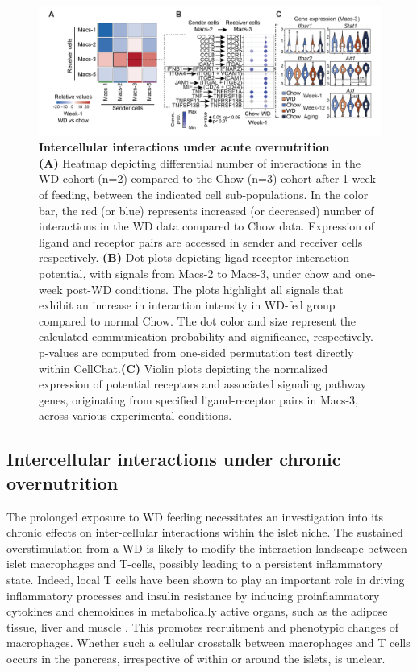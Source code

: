 \begin{figure}[!t]
\centering
\includegraphics[width=\linewidth]{Chapter4/Fig/F2-6-01.png}
\caption[res-cciw1]{\textbf{Intercellular interactions under acute overnutrition}\\
\textbf{(A)} Heatmap depicting differential number of interactions in the WD cohort (n=2) compared to the Chow (n=3) cohort after 1 week of feeding, between the indicated cell sub-populations. In the color bar, the red (or blue) represents increased (or decreased) number of interactions in the WD data compared to Chow data. Expression of ligand and receptor pairs are accessed in sender and receiver cells respectively. \textbf{(B)} Dot plots depicting ligad-receptor interaction potential, with signals from Macs-2 to Macs-3, under chow and one-week post-WD conditions. The plots highlight all signals that exhibit an increase in interaction intensity in WD-fed group compared to normal Chow. The dot color and size represent the calculated communication probability and significance, respectively. p-values are computed from one-sided permutation test directly within CellChat.\textbf{(C)} Violin plots depicting the normalized expression of potential receptors and associated signaling pathway genes, originating from specified ligand-receptor pairs in Macs-3, across various experimental conditions.
}
\label{fig2-6}
\end{figure}

\subsection{Intercellular interactions under chronic overnutrition}
The prolonged exposure to WD feeding necessitates an investigation into its chronic effects on inter-cellular interactions within the islet niche. The sustained overstimulation from a WD is likely to modify the interaction landscape between islet macrophages and T-cells, possibly leading to a persistent inflammatory state. Indeed, local T cells have been shown to play an important role in driving inflammatory processes and insulin resistance by inducing proinflammatory cytokines and chemokines in metabolically active organs, such as the adipose tissue, liver and muscle \textbf{\cite{FIND}}. This promotes recruitment and phenotypic changes of macrophages. Whether such a cellular crosstalk between macrophages and T cells occurs in the pancreas, irrespective of within or around the islets, is unclear.

